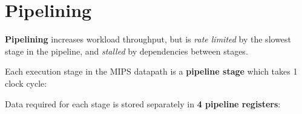 \section{Pipelining}
\textbf{Pipelining} increases workload throughput, but is \textit{rate limited} by the
slowest stage in the pipeline, and \textit{stalled} by dependencies between stages.

Each execution stage in the MIPS datapath is a \textbf{pipeline stage} which takes 1 clock cycle:

\begin{enumerate}
\end{enumerate}

Data required for each stage is stored separately in \textbf{4 pipeline registers}:

\begin{enumerate}
\end{enumerate}

